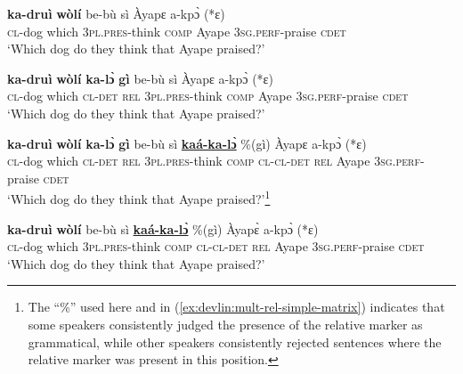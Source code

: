 \documentclass[output=paper]{langscibook}
\begin{document}
\begin{xlist}
\ex \label{ex:devlin:mult-rel-base}
\gll \textbf{ka-dru\`{i}} \textbf{w\`{o}l\'{i}} be-b\`{u} s\`{i} \`{A}yapɛ a-kp\`{ɔ} (*ɛ)\\
\textsc{cl}-dog which \textsc{3pl.pres}-think \textsc{comp} Ayape 3\textsc{sg.perf}-praise \textsc{cdet}  \\
\glt `Which dog do they think that Ayape praised?’

\ex \label{ex:devlin:mult-rel-rel}
\gll \textbf{ka-dru\`{i}} \textbf{w\`{o}l\'{i}} \textbf{ka-l\`{ɔ}} \textbf{g\`{i}} be-b\`{u} s\`{i} \`{A}yapɛ a-kp\`{ɔ} (*ɛ)\\
\textsc{cl}-dog which \textsc{cl}-\textsc{det} \textsc{rel} \textsc{3pl.pres}-think \textsc{comp} Ayape 3\textsc{sg.perf}-praise \textsc{cdet}  \\
\glt `Which dog do they think that Ayape praised?’

\ex \label{ex:devlin:mult-rel-kakalo}
\gll \textbf{ka-dru\`{i}} \textbf{w\`{o}l\'{i}} \textbf{ka-l\`{ɔ}} \textbf{g\`{i}} be-b\`{u} s\`{i} \uline{\textbf{ka\'{a}-ka-l\`{ɔ}}} \%(g\`{i}) \`{A}yapɛ a-kp\`{ɔ} (*ɛ) \\
\textsc{cl}-dog which \textsc{cl}-\textsc{det} \textsc{rel} 3\textsc{pl.pres}-think \textsc{comp} \textsc{cl}-\textsc{cl}-\textsc{det} \textsc{rel} Ayape 3\textsc{sg.perf}-praise \textsc{cdet}%
\\
\glt `Which dog do they think that Ayape praised?’\footnote{The ``\%'' used here and in (\ref{ex:devlin:mult-rel-simple-matrix})  indicates that some speakers consistently judged the presence of the relative marker as grammatical, while other speakers consistently rejected sentences where the relative marker was present in this position.}

\ex \label{ex:devlin:mult-rel-simple-matrix}
\gll \textbf{ka-dru\`{i}} \textbf{w\`{o}l\'{i}} be-b\`{u} s\`{i} \uline{\textbf{ka\'{a}-ka-l\`{ɔ}}} \%(g\`{i}) \`{A}yap\`{ɛ} a-kp\`{ɔ} (*ɛ)\\
\textsc{cl}-dog which 3\textsc{pl.pres}-think \textsc{comp} \textsc{cl}-\textsc{cl-det} \textsc{rel} Ayape 3\textsc{sg.perf}-praise \textsc{cdet}  \\
\glt `Which dog do they think that Ayape praised?’
\end{xlist}
\z
\end{document}
